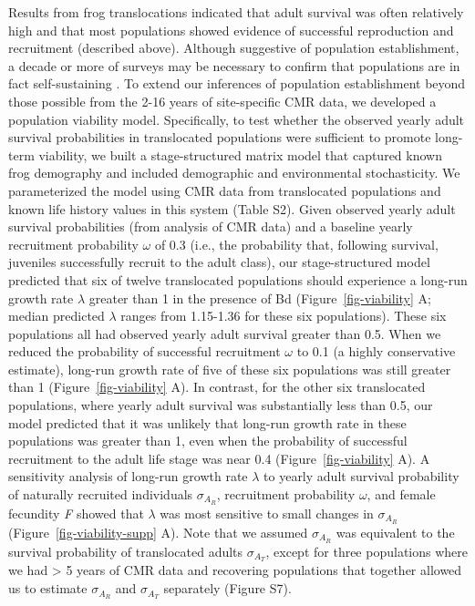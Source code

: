 \documentclass[9pt,twocolumn,twoside,lineno]{pnas-new}
\begin{document}
Results from frog translocations indicated that adult survival was often
relatively high and that most populations showed evidence of successful
reproduction and recruitment (described above). Although suggestive of
population establishment, a decade or more of surveys may be necessary
to confirm that populations are in fact self-sustaining
\citep{joseph2018}. To extend our inferences of population establishment
beyond those possible from the 2-16 years of site-specific CMR data, we
developed a population viability model. Specifically, to test whether
the observed yearly adult survival probabilities in translocated
populations were sufficient to promote long-term viability, we built a
stage-structured matrix model that captured known frog demography and
included demographic and environmental stochasticity. We parameterized
the model using CMR data from translocated populations and known life
history values in this system (Table S2). Given
observed yearly adult survival probabilities (from analysis of CMR data)
and a baseline yearly recruitment probability \(\omega\) of 0.3 (i.e.,
the probability that, following survival, juveniles successfully recruit
to the adult class), our stage-structured model predicted that six of
twelve translocated populations should experience a long-run growth rate
\(\lambda\) greater than 1 in the presence of Bd
(Figure~\ref{fig-viability} A; median predicted \(\lambda\) ranges from
1.15-1.36 for these six populations). These six populations all had
observed yearly adult survival greater than 0.5. When we reduced the
probability of successful recruitment \(\omega\) to 0.1 (a highly
conservative estimate), long-run growth rate of five of these six
populations was still greater than 1 (Figure~\ref{fig-viability} A). In
contrast, for the other six translocated populations, where yearly adult
survival was substantially less than 0.5, our model predicted that it
was unlikely that long-run growth rate in these populations was greater
than 1, even when the probability of successful recruitment to the adult
life stage was near 0.4 (Figure~\ref{fig-viability} A). A sensitivity
analysis of long-run growth rate \(\lambda\) to yearly adult survival
probability of naturally recruited individuals \(\sigma_{A_R}\),
recruitment probability \(\omega\), and female fecundity \emph{F} showed
that \(\lambda\) was most sensitive to small changes in \(\sigma_{A_R}\)
(Figure~\ref{fig-viability-supp} A). Note that we assumed
\(\sigma_{A_R}\) was equivalent to the survival probability of
translocated adults \(\sigma_{A_T}\), except for three populations where
we had \textgreater{} 5 years of CMR data and recovering populations
that together allowed us to estimate \(\sigma_{A_R}\) and
\(\sigma_{A_T}\) separately (Figure S7).
\end{document}
